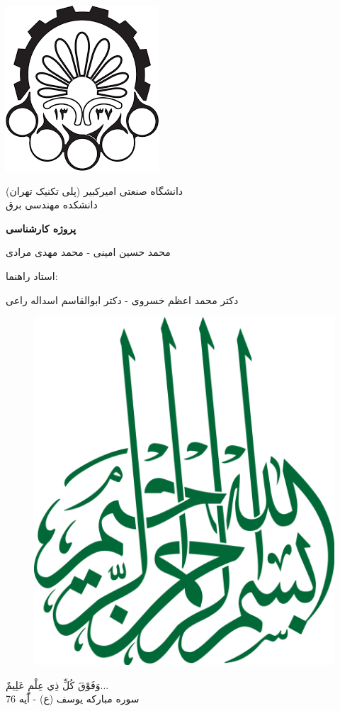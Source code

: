 \documentclass{article}
\begin{document}
	\begin{titlepage} 
		\centering  
		\includegraphics [width = 0.15 \textwidth] {AUT.png} \par \vspace { 0cm }
				{ \scshape \LARGE 
					دانشگاه صنعتی امیرکبیر (پلی تکنیک تهران)\\
					دانشکده مهندسی برق
					\par }
		\vspace { 2cm } 
		{ \Huge \bfseries 
پروژه کارشناسی
			\par } 
		\vspace { 4cm } 
		{ \huge
			محمد حسین امینی  -  محمد مهدی مرادی
			 } 
		\vfill 
		{ \huge
استاد راهنما:
\par 
دکتر محمد اعظم خسروی - دکتر ابوالقاسم اسداله راعی
		}
		\vfill
		 
		\vspace { 2cm } 
	\end{titlepage} 
\newpage
\begin{figure}[h!]
\includegraphics[width=\textwidth]{A3.png}
\end{figure}
\begin{flushleft}
{
\LARGE
وَفَوْقَ كُلِّ ذِي عِلْمٍ عَلِيمٌ...\\
}
{
\large
سوره مبارکه یوسف (ع) - آیه 76
}
\end{flushleft}
\end{document}
